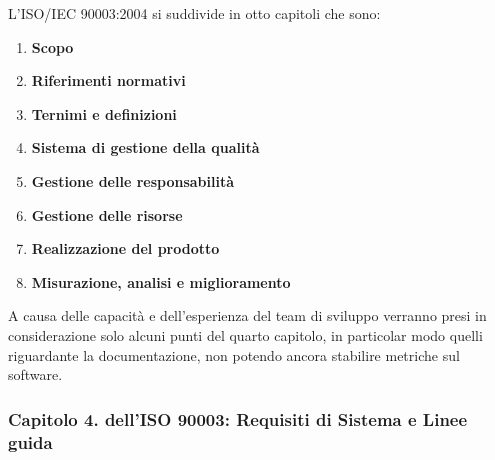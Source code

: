 	L'ISO/IEC 90003:2004 si suddivide in otto capitoli che sono:
	
	\begin{enumerate}
		\item \textbf{Scopo}
		\item \textbf{Riferimenti normativi}
		\item \textbf{Ternimi e definizioni}
		\item \textbf{Sistema di gestione della qualità}
		\item \textbf{Gestione delle responsabilità}
		\item \textbf{Gestione delle risorse}
		\item \textbf{Realizzazione del prodotto}
		\item \textbf{Misurazione, analisi e miglioramento}
	\end{enumerate}

	A causa delle capacità e dell'esperienza del team di sviluppo verranno presi in considerazione solo alcuni punti del quarto capitolo, in particolar modo quelli riguardante la documentazione, non potendo ancora stabilire metriche sul software.
	
	\subsubsection{Capitolo 4. dell'ISO 90003: Requisiti di Sistema e Linee guida}
	
